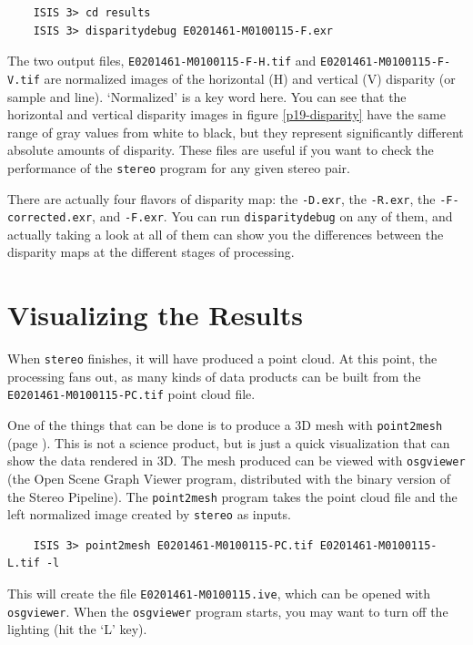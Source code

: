 \begin{verbatim}
    ISIS 3> cd results
    ISIS 3> disparitydebug E0201461-M0100115-F.exr
\end{verbatim}

\noindent
The two output files, \texttt{E0201461-M0100115-F-H.tif} and
\texttt{E0201461-M0100115-F-V.tif} are normalized images of the
horizontal (H) and vertical (V) disparity (or sample and line).
`Normalized' is a key word here.  You can see that the horizontal
and vertical disparity images in figure \ref{p19-disparity} have
the same range of gray values from white to black, but they represent
significantly different absolute amounts of disparity.  These files
are useful if you want to check the performance of the \texttt{stereo}
program for any given stereo pair.

There are actually four flavors of disparity map: the \texttt{-D.exr},
the \texttt{-R.exr}, the \texttt{-F-corrected.exr}, and \texttt{-F.exr}.
You can run \texttt{disparitydebug} on any of them, and actually taking a
look at all of them can show you the differences between the disparity maps
at the different stages of processing.

\section{Visualizing the Results}

When \texttt{stereo} finishes, it will have produced a point cloud.
At this point, the processing fans out, as many kinds of data
products can be built from the \texttt{E0201461-M0100115-PC.tif} point cloud
file.

One of the things that can be done is to produce a 3D mesh with
\texttt{point2mesh} (page \pageref{point2mesh}). This is not a science
product, but is just a quick visualization that can show the data
rendered in 3D. The mesh produced can be viewed with
\texttt{osgviewer} (the Open Scene Graph Viewer program, distributed
with the binary version of the Stereo Pipeline).  The
\texttt{point2mesh} program takes the point cloud file and the left
normalized image created by \texttt{stereo} as inputs.

\begin{verbatim}
    ISIS 3> point2mesh E0201461-M0100115-PC.tif E0201461-M0100115-L.tif -l
\end{verbatim}

\noindent
This will create the file \texttt{E0201461-M0100115.ive}, which can be opened
with \texttt{osgviewer}. When the \texttt{osgviewer} program starts,
you may want to turn off the lighting (hit the `L' key).

